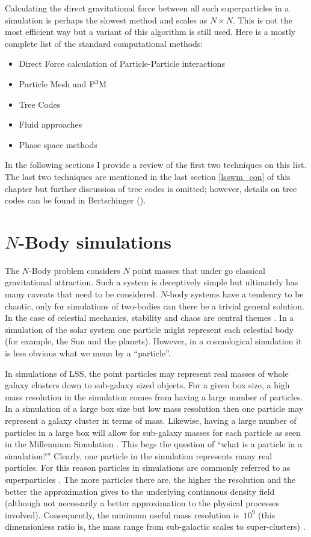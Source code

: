 Calculating the direct gravitational force between all such superparticles in a simulation is perhaps the slowest method and scales as $N \times N$. This is not the most efficient way but a variant of this algorithm is still used. Here is a mostly complete list of the standard computational methods:
\begin{itemize}
\item Direct Force calculation of Particle-Particle interactions
\item Particle Mesh and ${\rm P^3 M}$
\item Tree Codes
\item Fluid approaches
\item Phase space methods
\end{itemize}

\noindent In the following sections I provide a review of the first two techniques on this list. The last two techniques are mentioned in the last section \ref{lsswm_con} of this chapter but further discussion of tree codes is omitted; however, details on tree codes can be found in Bertschinger (\citeyear{bib_bert}).

\section{$N$-Body simulations}
\label{sec.dir_nb}
The $N$-Body problem considers $N$ point masses that under go classical gravitational attraction. Such a system is deceptively simple but ultimately has many caveats that need to be considered. $N$-body systems have a tendency to be chaotic, only for simulations of two-bodies can there be a trivial general solution. In the case of celestial mechanics, stability and chaos are central themes \citep{bib_aar}. In a simulation of the solar system one particle might represent each celestial body (for example, the Sun and the planets). However, in a cosmological simulation it is less obvious what we mean by a ``particle''. \citep{bib_he, bib_hmpc}

In simulations of LSS, the point particles may represent real masses of whole galaxy clusters down to sub-galaxy sized objects. For a given box size, a high mass resolution in the simulation comes from having a large number of particles. In a simulation of a large box size but low mass resolution then one particle may represent a galaxy cluster in terms of mass. Likewise, having a large number of particles in a large box will allow for sub-galaxy masses for each particle as seen in the Millennium Simulation \citep{bib_spr}. This begs the question of ``what is a particle in a simulation?'' Clearly, one particle in the simulation represents many real particles. For this reason particles in simulations are commonly referred to as superparticles \citep{bib_he}. The more particles there are, the higher the resolution and the better the approximation gives to the underlying continuous density field (although not necessarily a better approximation to the physical processes involved). Consequently, the minimum useful mass resolution is $~10^9$ (this dimensionless ratio is, the mass range from sub-galactic scales to super-clusters) \citep{bib_hmpc}.

